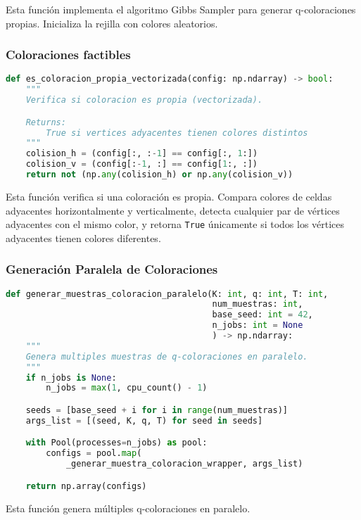Esta función implementa el algoritmo Gibbs Sampler para generar q-coloraciones propias. Inicializa la rejilla con colores aleatorios.

\subsubsection{Coloraciones factibles}

\begin{lstlisting}[language=Python]
def es_coloracion_propia_vectorizada(config: np.ndarray) -> bool:
    """
    Verifica si coloracion es propia (vectorizada).

    Returns:
        True si vertices adyacentes tienen colores distintos
    """
    colision_h = (config[:, :-1] == config[:, 1:])
    colision_v = (config[:-1, :] == config[1:, :])
    return not (np.any(colision_h) or np.any(colision_v))
\end{lstlisting}

Esta función verifica si una coloración es propia. Compara colores de celdas adyacentes horizontalmente y verticalmente, detecta cualquier par de vértices adyacentes con el mismo color, y retorna \texttt{True} únicamente si todos los vértices adyacentes tienen colores diferentes.

\subsubsection{Generación Paralela de Coloraciones}

\begin{lstlisting}[language=Python]
def generar_muestras_coloracion_paralelo(K: int, q: int, T: int,
                                         num_muestras: int,
                                         base_seed: int = 42,
                                         n_jobs: int = None
                                         ) -> np.ndarray:
    """
    Genera multiples muestras de q-coloraciones en paralelo.
    """
    if n_jobs is None:
        n_jobs = max(1, cpu_count() - 1)

    seeds = [base_seed + i for i in range(num_muestras)]
    args_list = [(seed, K, q, T) for seed in seeds]

    with Pool(processes=n_jobs) as pool:
        configs = pool.map(
            _generar_muestra_coloracion_wrapper, args_list)

    return np.array(configs)
\end{lstlisting}

Esta función genera múltiples q-coloraciones en paralelo.
